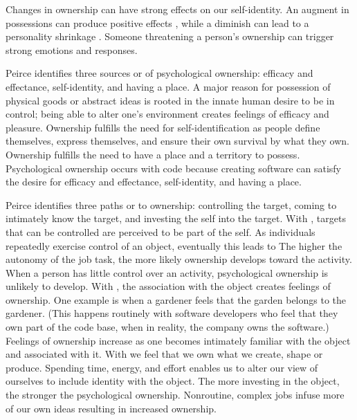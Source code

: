 Changes in ownership can have strong effects on our self-identity. An augment in possessions can produce positive effects \cite{Formanek1994}, while a diminish can lead to a personality shrinkage \cite{James1890}. Someone threatening a person's ownership can trigger strong emotions and responses.

Peirce \cite{Pierce2001} identifies three sources or  of psychological ownership: efficacy and effectance, self-identity, and having a place. A major reason for possession of physical goods or abstract ideas is rooted in the innate human desire to be in control; being able to alter one's environment creates feelings of efficacy and pleasure. Ownership fulfills the need for self-identification as people define themselves, express themselves, and ensure their own survival by what they own. Ownership fulfills the need to have a place and a territory to possess.  Psychological ownership occurs with code because creating software can satisfy the desire for efficacy and effectance, self-identity, and having a place.

Peirce identifies three paths or  to ownership: controlling the target, coming to intimately know the target, and investing the self into the target. With , targets that can be controlled are perceived to be part of the self.  As  individuals repeatedly exercise control of an object, eventually this leads to  The higher the autonomy of the job task, the more likely ownership develops toward the activity. When a person has little control over an activity, psychological ownership is unlikely to develop. With , the association with the object creates feelings of ownership. One example is when a gardener feels that the garden belongs to the gardener. (This happens routinely with software developers who feel that they own part of the code base, when in reality, the company owns the software.) Feelings of ownership increase as one becomes intimately familiar with the object and associated with it. With  we feel that we own what we create, shape or produce. Spending time, energy, and effort enables us to alter our view of ourselves to include identity with the object. The more investing in the object, the stronger the psychological ownership. Nonroutine, complex jobs infuse more of our own ideas resulting in increased ownership.

